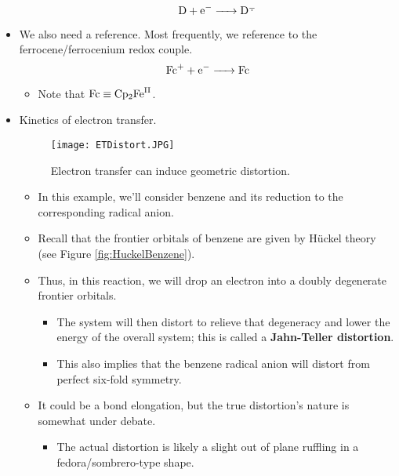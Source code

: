 \documentclass[../notes.tex]{subfiles}
\begin{document}
\begin{itemize}
\begin{itemize}
        \begin{equation*}
            \ce{D + e^- -> D\ra}
        \end{equation*}
    \end{itemize}
    \item We also need a reference. Most frequently, we reference to the ferrocene/ferrocenium redox couple.
    \begin{equation*}
        \ce{Fc+ + e^- -> Fc}
    \end{equation*}
    \begin{itemize}
        \item Note that $\ce{Fc}\equiv\ce{Cp2Fe^{II}}$.
    \end{itemize}
    \item Kinetics of electron transfer.
    \begin{figure}[h!]
        \centering
        \texttt{[image: ETDistort.JPG]}
        \caption{Electron transfer can induce geometric distortion.}
        \label{fig:ETDistort}
    \end{figure}
    \begin{itemize}
        \item In this example, we'll consider benzene and its reduction to the corresponding radical anion.
        \item Recall that the frontier orbitals of benzene are given by H\"{u}ckel theory (see Figure \ref{fig:HuckelBenzene}).
        \item Thus, in this reaction, we will drop an electron into a doubly degenerate frontier orbitals.
        \begin{itemize}
            \item The system will then distort to relieve that degeneracy and lower the energy of the overall system; this is called a \textbf{Jahn-Teller distortion}.
            \item This also implies that the benzene radical anion will distort from perfect six-fold symmetry.
        \end{itemize}
        \item It could be a  bond elongation, but the true distortion's nature is somewhat under debate.
        \begin{itemize}
            \item The actual distortion is likely a slight out of plane ruffling in a fedora/sombrero-type shape.
        \end{itemize}
    \end{itemize}

\end{itemize}
\end{document}
